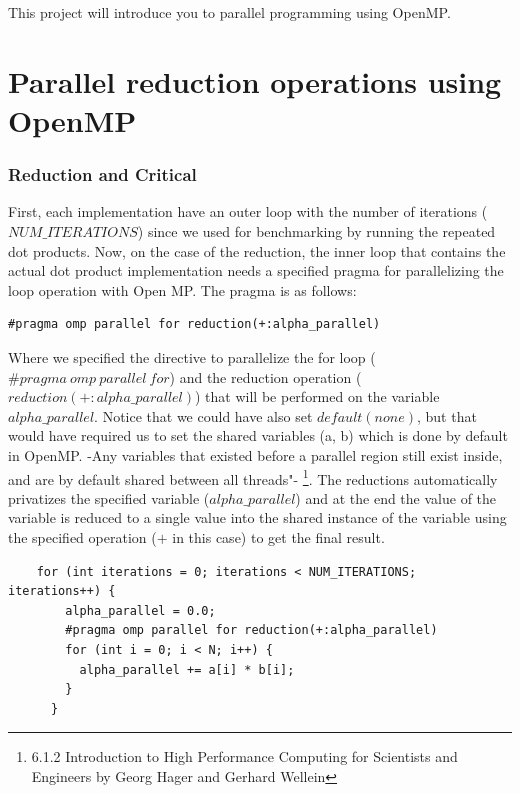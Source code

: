 \documentclass[unicode,11pt,a4paper,oneside,numbers=endperiod,openany]{scrartcl}
\begin{document}
\setassignment

\newline

\assignmentpolicy
This project will introduce you to parallel programming using OpenMP. 

\section{Parallel reduction operations using OpenMP }
\subsubsection{Reduction and Critical}
First, each implementation have an outer loop with the number of iterations ($NUM\_ITERATIONS$) since we used for benchmarking by running
the repeated dot products. 
Now, on the case of the reduction, the inner loop that contains the actual dot product implementation needs a specified pragma 
for parallelizing the loop operation with Open MP. The pragma is as follows:
\begin{lstlisting}
#pragma omp parallel for reduction(+:alpha_parallel)
\end{lstlisting}
Where we specified the directive to parallelize the for loop ($\#pragma\ omp\ parallel\ for$) and the reduction operation 
($reduction(+:alpha\_parallel)$) that will be performed on the variable $alpha\_parallel$. Notice that we could have also set $default(none)$, but
that would have required us to set the shared variables (a, b) which is done by default in OpenMP. -Any variables that existed before a parallel region still exist inside, and are by
default shared between all threads"- \footnote{ 6.1.2 Introduction to High Performance Computing for Scientists and Engineers by Georg Hager and Gerhard Wellein}.
The reductions automatically privatizes the specified variable ($alpha\_parallel$) and at the end the value of the variable is reduced to a single value into the shared instance of the variable 
using the specified operation ($+$ in this case) to get the final result. 

\begin{lstlisting}
    for (int iterations = 0; iterations < NUM_ITERATIONS; iterations++) {
        alpha_parallel = 0.0;
        #pragma omp parallel for reduction(+:alpha_parallel)
        for (int i = 0; i < N; i++) {
          alpha_parallel += a[i] * b[i];
        }
      }
\end{lstlisting}
\end{document}

